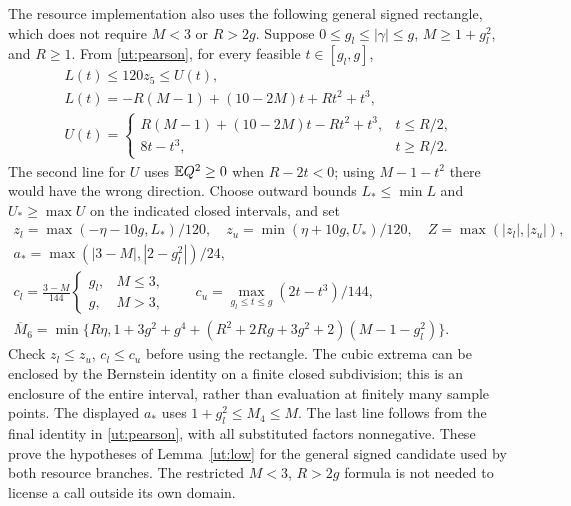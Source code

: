 The resource implementation also uses the following general signed
rectangle, which does not require $M<3$ or $R>2g$.
Suppose $0\le g_l\le|\gamma|\le g$, $M\ge1+g_l^2$, and $R\ge1$.
From \eqref{ut:pearson}, for every feasible $t\in[g_l,g]$,
\begin{gather*}
 L(t)\le120z_5\le U(t),\\
 L(t)=-R(M-1)+(10-2M)t+Rt^2+t^3,\\
 U(t)=\begin{cases}
 R(M-1)+(10-2M)t-Rt^2+t^3,&t\le R/2,\\
 8t-t^3,&t\ge R/2.
 \end{cases}
\end{gather*}
The second line for $U$ uses $\mathbb E Q^2\ge0$ when $R-2t<0$;
using $M-1-t^2$ there would have the wrong direction.
Choose outward bounds $L_*\le\min L$ and $U_*\ge\max U$ on the
indicated closed intervals, and set
\begin{gather*}
 z_l=\max(-\eta-10g,L_*)/120,\quad
 z_u=\min(\eta+10g,U_*)/120,\quad Z=\max(|z_l|,|z_u|),\\
 a_* =\max(|3-M|,|2-g_l^2|)/24,\\
 c_l=\frac{3-M}{144}
       \begin{cases}g_l,&M\le3,\\g,&M>3,\end{cases}
 \qquad c_u=\max_{g_l\le t\le g}(2t-t^3)/144,\\
 \overline M_6=\min\{R\eta,
  1+3g^2+g^4+(R^2+2Rg+3g^2+2)(M-1-g_l^2)\}.
\end{gather*}
Check $z_l\le z_u$, $c_l\le c_u$ before using the rectangle.
The cubic extrema can be enclosed by the Bernstein identity on a
finite closed subdivision; this is an enclosure of the entire
interval, rather than evaluation at finitely many sample points.
The displayed $a_*$ uses $1+g_l^2\le M_4\le M$.
The last line follows from the final identity in \eqref{ut:pearson},
with all substituted factors nonnegative. These prove the hypotheses
of Lemma~\ref{ut:low} for the general signed candidate used by both
resource branches. The restricted $M<3$, $R>2g$ formula is not needed
to license a call outside its own domain.

